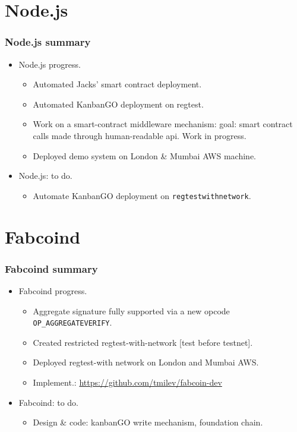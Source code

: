 \section{Node.js}
\begin{frame}[fragile]
\frametitle{Node.js summary}
\begin{itemize}
\item Node.js progress.
\begin{itemize}
\item Automated Jacks' smart contract deployment.
\item Automated KanbanGO deployment on regtest.
\item Work on a smart-contract middleware mechanism: goal: smart contract calls made through human-readable api. Work in progress.
\item Deployed demo system on London \& Mumbai AWS machine.
\end{itemize}
\item Node.js: to do.
\begin{itemize}
\item Automate KanbanGO deployment on \verb|regtestwithnetwork|.
\end{itemize}
\end{itemize}
\end{frame}

\section{Fabcoind}
\begin{frame}[fragile]
\frametitle{Fabcoind summary}
\begin{itemize}
\item Fabcoind progress.
\begin{itemize}
\item Aggregate signature fully supported via a new opcode \verb|OP_AGGREGATEVERIFY|.
\item Created restricted regtest-with-network [test before testnet].
\item Deployed regtest-with network on London and Mumbai AWS.
\item Implement.: \url{https://github.com/tmilev/fabcoin-dev}
\end{itemize}
\item Fabcoind: to do.
\begin{itemize}
\item Design \& code: kanbanGO write mechanism, foundation chain.
\end{itemize} 
\end{itemize}
\end{frame}

